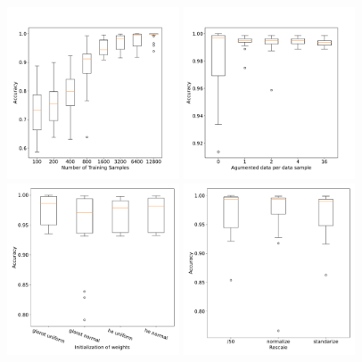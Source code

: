 \documentclass[prl,twocolumn]{revtex4-1}
\begin{document}
\begin{figure}[!tb]
  \centering
  \includegraphics[width=0.455\textwidth]{task_1/figures/num_train_box_30.pdf}
  \hskip 0.5mm
  \includegraphics[width=0.455\textwidth]{task_1/figures/ag_train_box_30.pdf}
  \vskip 0.5mm
  \includegraphics[width=0.455\textwidth]{task_1/figures/init_weights_box_30.pdf}
  \hskip 0.5mm
  \includegraphics[width=0.455\textwidth]{task_1/figures/rescale_box_30.pdf}

\end{figure}
\end{document}
